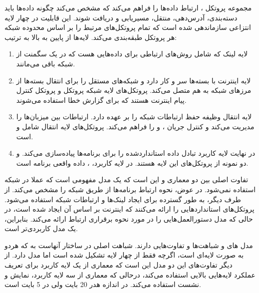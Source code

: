 \documentclass{article}
\begin{document}
مجموعه پروتکل ، ارتباط  داده‌ها را فراهم می‌کند که مشخص می‌کند چگونه داده‌ها باید دسته‌بندی، آدرس‌دهی، منتقل، مسیریابی و دریافت شوند.
این قابلیت در چهار لایه انتزاعی سازماندهی شده است که تمام پروتکل‌های مرتبط را بر اساس محدوده شبکه هر پروتکل طبقه‌بندی می‌کند. لایه‌ها از پایین به بالا به ترتیب:
\begin{enumerate}
	\item
	  لایه لینک  که شامل روش‌های ارتباطی برای داده‌هایی هست که در یک سگمنت از شبکه باقی می‌مانند. 
	\item 
	لایه اینترنت  با بسته‌ها سر و کار دارد و شبکه‌های مستقل را برای انتقال بسته‌ها از مرزهای شبکه به هم متصل می‌کند. پروتکل‌های لایه شبکه پروتکل  و پروتکل کنترل پیام اینترنت  هستند که برای گزارش خطا استفاده می‌شوند. 
	\item
	لایه انتقال  وظیفه حفظ ارتباطات  شبکه را بر عهده دارد.  ارتباطات بین میزبان‌ها را مدیریت می‌کند و کنترل جریان ،  و  را فراهم می‌کند. پروتکل‌های لایه انتقال شامل  و  است. 
	\item
	در نهایت لایه کاربرد  تبادل داده استاندارد‌شده را برای برنامه‌ها پیاده‌سازی می‌کند.  و  دو نمونه از پروتکل‌های این لایه هستند. در لایه کاربرد، ، داده واقعی برنامه است.
\end{enumerate}

تفاوت اصلی بین دو معماری  و  این است که  یک مدل مفهومی است که عملا در شبکه استفاده نمی‌شود. در عوض، نحوه ارتباط برنامه‌ها از طریق شبکه را مشخص می‌کند. از طرف دیگر،  به طور گسترده برای ایجاد لینک‌ها و ارتباطات شبکه استفاده می‌شود.
پروتکل‌های  استانداردهایی را ارائه می‌کنند که اینترنت بر اساس آن ایجاد شده است، در حالی که مدل  دستورالعمل‌هایی را در مورد نحوه برقراری ارتباط ارائه می‌کند. بنابراین،  یک مدل کاربردی‌تر است.

مدل های  و  شباهت‌ها و تفاوت‌هایی دارند. شباهت اصلی در ساختار آنهاست به که هردو به صورت لایه‌ای است، اگرچه  فقط از چهار لایه تشکیل شده است اما مدل  دارد.
از دیگر تفاوت‌های این دو مدل این است که معماری  از یک لایه کاربرد برای تعریف عملکرد لایه‌هایی بالایی استفاده می‌کند، درحالی که معماری  از سه لایه کاربرد، نمایش و نشست استفاده می‌کند. در  اندازه هدر  20 بایت ولی در  5 بایت است. 
\end{document}
